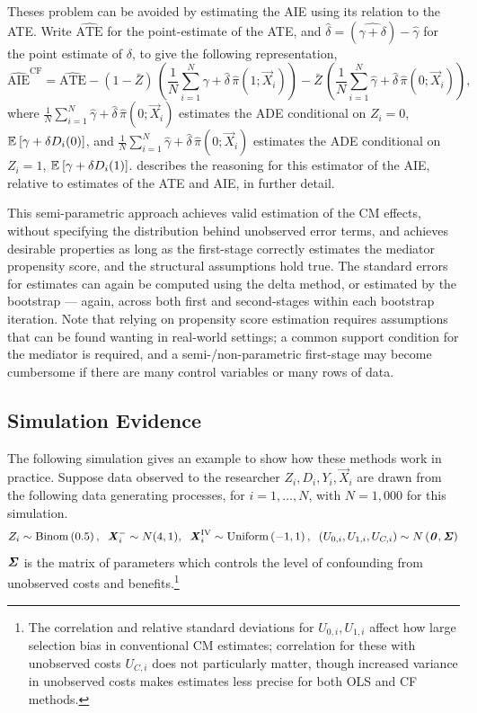 Theses problem can be avoided by estimating the AIE using its relation to the ATE.
Write $\hat{\text{ATE}}$ for the point-estimate of the ATE, and 
$\hat\delta = (\hat{\gamma + \delta}) - \hat\gamma$ for the point estimate of $\delta$, to give the following representation,
\[ \hat{\text{AIE}}^{\text{CF}}
    = \hat{\text{ATE}}
    - (1 - \bar Z) \, \left( 
        \frac 1N \sum_{i = 1}^N \hat\gamma + \hat \delta \, \hat\pi(1; \vec X_i) \right)
    - \bar Z \, \left(
        \frac 1N \sum_{i = 1}^N \hat\gamma + \hat \delta \, \hat\pi(0; \vec X_i)  \right), \]
where $\frac 1N \sum_{i = 1}^N \hat\gamma + \hat \delta \, \hat\pi(0; \vec X_i)$ estimates the ADE conditional on $Z_i = 0$, $\mathbb{E}_{} \left[ \gamma + \delta D_i(0) \right]$, and $\frac 1N \sum_{i = 1}^N \hat\gamma + \hat \delta \, \hat\pi(0; \vec X_i)$ estimates the ADE conditional on $Z_i = 1$, $\mathbb{E}_{} \left[ \gamma + \delta D_i(1) \right]$.
 describes the reasoning for this estimator of the AIE, relative to estimates of the ATE and AIE, in further detail.

This semi-parametric approach achieves valid estimation of the CM effects, without specifying the distribution behind unobserved error terms, and achieves desirable properties as long as the first-stage correctly estimates the mediator propensity score, and the structural assumptions hold true.
The standard errors for estimates can again be computed using the delta method, or estimated by the bootstrap --- again, across both first and second-stages within each bootstrap iteration.
Note that relying on propensity score estimation requires assumptions that can be found wanting in real-world settings; a common support condition for the mediator is required, and a semi-/non-parametric first-stage may become cumbersome if there are many control variables or many rows of data.

\subsection{Simulation Evidence}
\label{sec:simulations}
The following simulation gives an example to show how these methods work in practice.
Suppose data observed to the researcher $Z_i, D_i, Y_i, \vec X_i$ are drawn from the following data generating processes, for $i = 1, \hdots, N$, with 
$N = 1,000$ for this simulation.
\[ Z_i \sim \text{Binom}\left(0.5 \right),
    \;\; \boldsymbol{\mathit{X}}_i^- \sim N(4, 1),
    \;\; \boldsymbol{\mathit{X}}_i^{\text{IV}} \sim \text{Uniform}\left( -1, 1 \right),
    \;\; \left( U_{0,i}, U_{1,i}, U_{C,i} \right) \sim
    N\left( \boldsymbol{\mathit{0}}, \boldsymbol{\mathit{\Sigma}} \right) \]
$\boldsymbol{\mathit{\Sigma}}$ is the matrix of parameters which controls the level of confounding from unobserved costs and benefits.\footnote{
    The correlation and relative standard deviations for $U_{0,i}, U_{1,i}$ affect how large selection bias in conventional CM estimates; correlation for these with unobserved costs $U_{C,i}$ does not particularly matter, though increased variance in unobserved costs makes estimates less precise for both OLS and CF methods.
}

